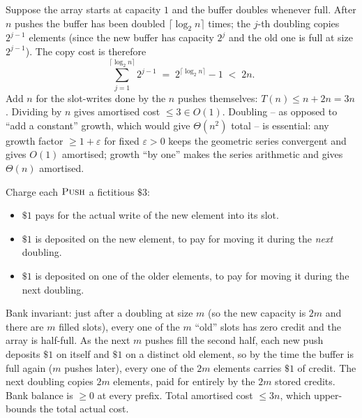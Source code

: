 \begin{example}
\label{ex:dyn_array_aggregate}
Suppose the array starts at capacity $1$ and the buffer doubles whenever full. After $n$ pushes the buffer has been doubled $\lceil \log_2 n \rceil$ times; the $j$-th doubling copies $2^{j-1}$ elements (since the new buffer has capacity $2^j$ and the old one is full at size $2^{j-1}$). The copy cost is therefore
\[
  \sum_{j=1}^{\lceil \log_2 n \rceil} 2^{j-1} \;=\; 2^{\lceil \log_2 n \rceil} - 1 \;<\; 2n.
\]
Add $n$ for the slot-writes done by the $n$ pushes themselves: $T(n) \le n + 2n = 3n$. Dividing by $n$ gives amortised cost $\le 3 \in O(1)$. Doubling -- as opposed to ``add a constant'' growth, which would give $\Theta(n^2)$ total -- is essential: any growth factor $\ge 1 + \varepsilon$ for fixed $\varepsilon > 0$ keeps the geometric series convergent and gives $O(1)$ amortised; growth ``by one'' makes the series arithmetic and gives $\Theta(n)$ amortised.
\end{example}

\begin{example}
\label{ex:dyn_array_accounting}
Charge each $\textsc{Push}$ a fictitious $\$3$:
\begin{itemize}
  \item $\$1$ pays for the actual write of the new element into its slot.
  \item $\$1$ is deposited on the new element, to pay for moving it during the \emph{next} doubling.
  \item $\$1$ is deposited on one of the older elements, to pay for moving it during the next doubling.
\end{itemize}
Bank invariant: just after a doubling at size $m$ (so the new capacity is $2m$ and there are $m$ filled slots), every one of the $m$ ``old'' slots has zero credit and the array is half-full. As the next $m$ pushes fill the second half, each new push deposits $\$1$ on itself and $\$1$ on a distinct old element, so by the time the buffer is full again ($m$ pushes later), every one of the $2m$ elements carries $\$1$ of credit. The next doubling copies $2m$ elements, paid for entirely by the $2m$ stored credits. Bank balance is $\ge 0$ at every prefix. Total amortised cost $\le 3n$, which upper-bounds the total actual cost.
\end{example}

